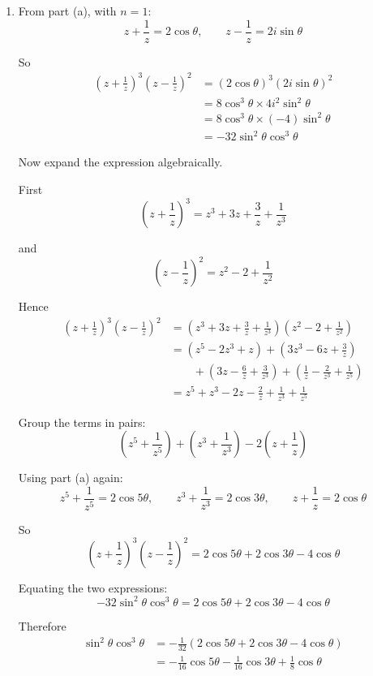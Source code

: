 \documentclass[leqno]{article}
\begin{document}
\begin{enumerate}[
  label=\textbf{\arabic*.},
  leftmargin=*,
  topsep=0pt,
  partopsep=0pt,
  parsep=0pt
]
\begin{djsSolution}
\begin{enumerate}[label=\textbf{(\alph*)}]
Hence
\[
z^n+\frac{1}{z^n}=2\cos n\theta,
\qquad
z^n-\frac{1}{z^n}=2i\sin n\theta
\]

  \item From part (a), with $n=1$:
\[
z+\frac{1}{z}=2\cos\theta,
\qquad
z-\frac{1}{z}=2i\sin\theta
\]

So
\begin{align*}
\left(z+\frac{1}{z}\right)^3\left(z-\frac{1}{z}\right)^2
&=(2\cos\theta)^3(2i\sin\theta)^2\\
&=8\cos^3\theta\times 4i^2\sin^2\theta\\
&=8\cos^3\theta\times (-4)\sin^2\theta\\
&=-32\sin^2\theta\cos^3\theta
\end{align*}

Now expand the expression algebraically.

First
\[
\left(z+\frac{1}{z}\right)^3=z^3+3z+\frac{3}{z}+\frac{1}{z^3}
\]

and
\[
\left(z-\frac{1}{z}\right)^2=z^2-2+\frac{1}{z^2}
\]

Hence
\begin{align*}
\left(z+\frac{1}{z}\right)^3\left(z-\frac{1}{z}\right)^2
&=\left(z^3+3z+\frac{3}{z}+\frac{1}{z^3}\right)\left(z^2-2+\frac{1}{z^2}\right)\\
&=\left(z^5-2z^3+z\right)+\left(3z^3-6z+\frac{3}{z}\right)\\
&\qquad+\left(3z-\frac{6}{z}+\frac{3}{z^3}\right)+\left(\frac{1}{z}-\frac{2}{z^3}+\frac{1}{z^5}\right)\\
&=z^5+z^3-2z-\frac{2}{z}+ \frac{1}{z^3}+\frac{1}{z^5}
\end{align*}

Group the terms in pairs:
\[
\left(z^5+\frac{1}{z^5}\right)+\left(z^3+\frac{1}{z^3}\right)-2\left(z+\frac{1}{z}\right)
\]

Using part (a) again:
\[
z^5+\frac{1}{z^5}=2\cos 5\theta,\qquad
z^3+\frac{1}{z^3}=2\cos 3\theta,\qquad
z+\frac{1}{z}=2\cos\theta
\]

So
\[
\left(z+\frac{1}{z}\right)^3\left(z-\frac{1}{z}\right)^2
=2\cos 5\theta+2\cos 3\theta-4\cos\theta
\]

Equating the two expressions:
\[
-32\sin^2\theta\cos^3\theta=2\cos 5\theta+2\cos 3\theta-4\cos\theta
\]

Therefore
\begin{align*}
\sin^2\theta\cos^3\theta
&=-\frac{1}{32}\left(2\cos 5\theta+2\cos 3\theta-4\cos\theta\right)\\
&=-\frac{1}{16}\cos 5\theta-\frac{1}{16}\cos 3\theta+\frac{1}{8}\cos\theta
\end{align*}


\end{enumerate}
\end{djsSolution}
\end{enumerate}
\end{document}

